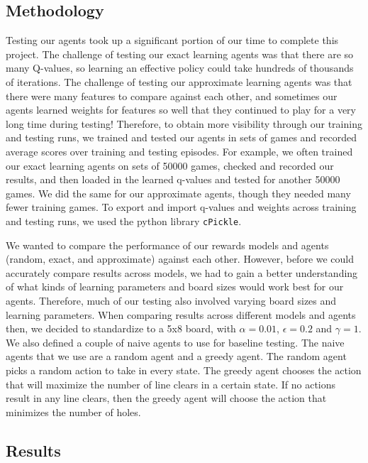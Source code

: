 \documentclass[11pt]{article}
\begin{document}
\subsection{Methodology}
Testing our agents took up a significant portion of our time to complete this project. The challenge of testing our exact learning agents was that there are so many Q-values, so learning an effective policy could take hundreds of thousands of iterations. The challenge of testing our approximate learning agents was that there were many features to compare against each other, and sometimes our agents learned weights for features so well that they continued to play for a very long time during testing! Therefore, to obtain more visibility through our training and testing runs, we trained and tested our agents in sets of games and recorded average scores over training and testing episodes. For example, we often trained our exact learning agents on sets of 50000 games, checked and recorded our results, and then loaded in the learned q-values and tested for another 50000 games. We did the same for our approximate agents, though they needed many fewer training games. To export and import q-values and weights across training and testing runs, we used the python library \texttt{cPickle}.

\bigskip

We wanted to compare the performance of our rewards models and agents (random, exact, and approximate) against each other. However, before we could accurately compare results across models, we had to gain a better understanding of what kinds of learning parameters and board sizes would work best for our agents. Therefore, much of our testing also involved varying board sizes and learning parameters. When comparing results across different models and agents then, we decided to standardize to a 5x8 board, with $\alpha=0.01$, $\epsilon=0.2$ and $\gamma=1$. We also defined a couple of naive agents to use for baseline testing. The naive agents that we use are a random agent and a greedy agent. The random agent picks a random action to take in every state. The greedy agent chooses the action that will maximize the number of line clears in a certain state. If no actions result in any line clears, then the greedy agent will choose the action that minimizes the number of holes.

\subsection{Results}
\end{document}
